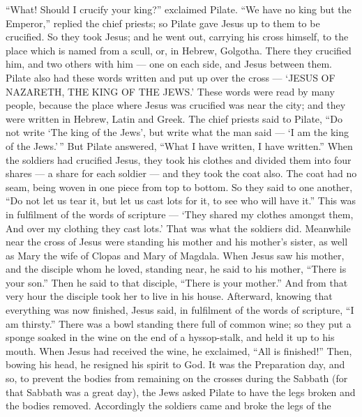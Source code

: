 ``What! Should I crucify your king?'' exclaimed Pilate. ``We have no
king but the Emperor,'' replied the chief priests;  so
Pilate gave Jesus up to them to be crucified. So they took Jesus;
 and he went out, carrying his cross himself, to the place
which is named from a scull, or, in Hebrew, Golgotha. 
There they crucified him, and two others with him --- one on each side,
and Jesus between them.  Pilate also had these words
written and put up over the cross --- `JESUS OF NAZARETH, THE KING OF
THE JEWS.'  These words were read by many people, because
the place where Jesus was crucified was near the city; and they were
written in Hebrew, Latin and Greek.  The chief priests said
to Pilate, ``Do not write `The king of the Jews', but write what the man
said --- `I am the king of the Jews.'\,''  But Pilate
answered, ``What I have written, I have written.''  When
the soldiers had crucified Jesus, they took his clothes and divided them
into four shares --- a share for each soldier --- and they took the coat
also. The coat had no seam, being woven in one piece from top to bottom.
 So they said to one another, ``Do not let us tear it, but
let us cast lots for it, to see who will have it.'' This was in
fulfilment of the words of scripture --- `They shared my clothes amongst
them, And over my clothing they cast lots.' That was what the soldiers
did.  Meanwhile near the cross of Jesus were standing his
mother and his mother's sister, as well as Mary the wife of Clopas and
Mary of Magdala.  When Jesus saw his mother, and the
disciple whom he loved, standing near, he said to his mother, ``There is
your son.''  Then he said to that disciple, ``There is your
mother.'' And from that very hour the disciple took her to live in his
house.  Afterward, knowing that everything was now
finished, Jesus said, in fulfilment of the words of scripture, ``I am
thirsty.''  There was a bowl standing there full of common
wine; so they put a sponge soaked in the wine on the end of a
hyssop-stalk, and held it up to his mouth.  When Jesus had
received the wine, he exclaimed, ``All is finished!'' Then, bowing his
head, he resigned his spirit to God.  It was the
Preparation day, and so, to prevent the bodies from remaining on the
crosses during the Sabbath (for that Sabbath was a great day), the Jews
asked Pilate to have the legs broken and the bodies removed.
 Accordingly the soldiers came and broke the legs of the
